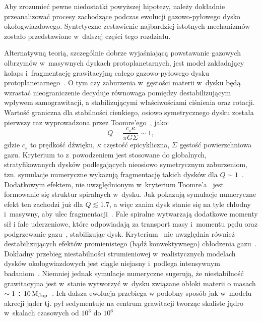 \par Aby zrozumieć pewne niedostatki powyższej hipotezy, należy
dokładnie przeanalizować procesy zachodzące podczas ewolucji gazowo-pyłowego
dysko okołogwiazdowego. Syntetyczne zestawienie najbardziej istotnych
mechanizmów zostało przedstawione w~dalszej części tego rozdziału.

\par Alternatywną teorią, szczególnie dobrze wyjaśniającą powstawanie
gazowych olbrzymów w~masywnych dyskach protoplanetarnych, jest model zakładający
kolaps i~fragmentację grawitacyjną całego gazowo-pyłowego dysku
protoplanetarnego~\cite{Boss97}. O tym czy zaburzenia w~gęstości materii w~dysku
będą wzrastać nieograniczenie decyduje równowaga pomiędzy destabilizującym
wpływem samograwitacji, a stabilizującymi właściwościami ciśnienia oraz rotacji.
Wartość graniczna dla stabilności cienkiego, osiowo symetrycznego dysku została
pierwszy raz wyprowadzona przez Toomre'ego~\cite{T64}, jako:
%
\begin{equation}
   Q = \frac{c_s\kappa}{\pi G \Sigma}\sim 1,
   \label{eq:toomre}
\end{equation}
%
gdzie $c_s$ to prędkość dźwięku, $\kappa$ częstość epicykliczna, $\Sigma$
gęstość powierzchniowa gazu. Kryterium to z~powodzeniem jest stosowane do
globalnych, stratyfikowanych dysków podlegających nieosiowo symetrycznym
zaburzeniom, tzn. symulacje numeryczne wykazują fragmentację takich dysków dla
$Q\sim 1$~\cite{NBAA98}. Dodatkowym efektem, nie uwzględnionym w~kryterium
Toomre'a~ jest formowanie się struktur spiralnych w~dysku. Jak
pokazują symulacje numeryczne efekt ten zachodzi już dla $Q\lesssim 1.7$, a więc
zanim dysk stanie się na tyle chłodny i~masywny, aby ulec
fragmentacji~\cite{Duris07}. Fale spiralne wytwarzają dodatkowe momenty sił i
fale uderzeniowe, które odpowiadają za transport masy i~momentu pędu oraz
podgrzewanie gazu~\cite{YC85}, stabilizując dysk. Kryterium~ nie
uwzględnia również destabilizujących efektów
promienistego (bądź konwektywnego) chłodzenia gazu~\cite{BMD06}. Dokładny
przebieg niestabilności strumieniowej w~realistycznych modelach dysków
okołogwiazdowych jest ciągle niejasny i~podlega intensywnym badaniom~\cite{MB11,
LC11}. Niemniej jednak symulacje numeryczne sugerują, że niestabilność
grawitacyjna jest w~stanie wytworzyć w~dysku związane obłoki materii o masach 
$\sim 1\div 10\hbox{$\mathrm{\thinspace M_{\textrm{Jup}}}$}$~\cite{BHM10, FR11}. Ich dalsza ewolucja przebiega w
podobny sposób jak w~modelu akrecji jąder tj. pył sedymentuje na centrum
grawitacji tworząc skaliste jądro w~skalach czasowych od $10^3$ do $10^6$
